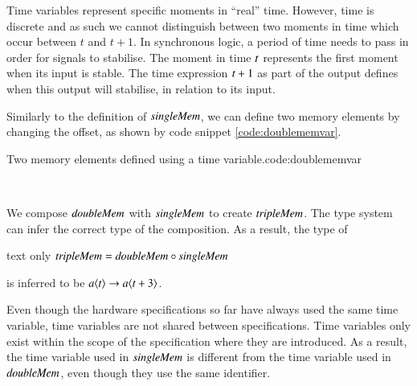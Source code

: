 Time variables represent specific moments in ``real'' time.
However, time is discrete and as such we cannot distinguish between two moments in time which occur between $t$ and $t + 1$.
In synchronous logic, a period of time needs to pass in order for signals to stabilise.
The moment in time \ensuremath{\Varid{t}} represents the first moment when its input is stable.
The time expression \ensuremath{\Varid{t}\mathbin{+}\mathrm{1}} as part of the output defines when this output will stabilise, in relation to its input.

Similarly to the definition of \ensuremath{\Varid{singleMem}}, we can define two memory elements by changing the offset, as shown by code snippet \ref{code:doublememvar}.
\begin{texexptitled}{Two memory elements defined using a time variable.}{code:doublememvar}\begin{hscode}\SaveRestoreHook
{}%
%
%
\>[3]{}\mathbin{::}\langle{}\rangle\to {}\langle{}\mathbin{+}\rangle{}\<[E]%
\\
\>[3]{}\;\mathrel{=}\<[E]%
\ColumnHook
\end{hscode}\resethooks
\end{texexptitled}

We compose \ensuremath{\Varid{doubleMem}} with \ensuremath{\Varid{singleMem}} to create \ensuremath{\Varid{tripleMem}}.
The type system can infer the correct type of the composition.
As a result, the type of 
\begin{changemargin}{1cm}{0cm}
\begin{expansionno}{text only}
\ensuremath{\Varid{tripleMem}\mathrel{=}\Varid{doubleMem}\mathbin{\circ}\Varid{singleMem}}
\end{expansionno}
\end{changemargin}
is inferred to be \ensuremath{\Varid{a}\langle\Varid{t}\rangle\to \Varid{a}\langle\Varid{t}\mathbin{+}\mathrm{3}\rangle}.

Even though the hardware specifications so far have always used the same time variable, time variables are not shared between specifications.
Time variables only exist within the scope of the specification where they are introduced.
As a result, the time variable used in \ensuremath{\Varid{singleMem}} is different from the time variable used in \ensuremath{\Varid{doubleMem}}, even though they use the same identifier.

